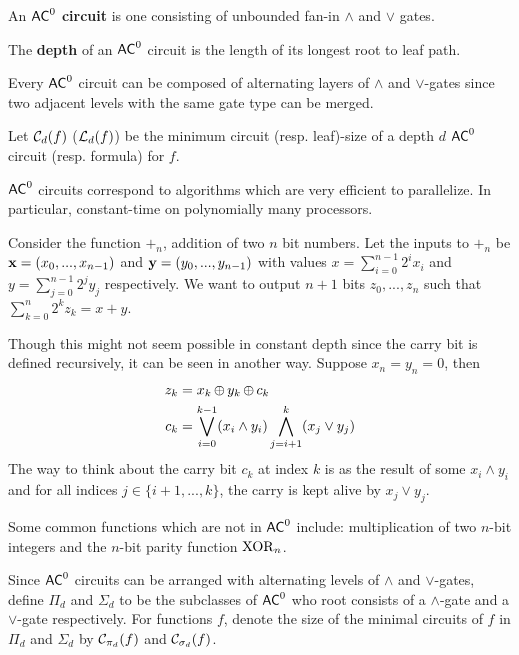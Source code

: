 \documentclass[11pt]{article}
\begin{document}
	\begin{definition}
		\label{def:classac0}
		An \textbf{$\mathsf{AC}^0$ circuit} is one consisting of unbounded fan-in $\land$ and $\lor$ gates. 
		
		The \textbf{depth} of an $\mathsf{AC}^0$ circuit is the length of its longest root to leaf path.
		
		Every $\mathsf{AC}^0$ circuit can be composed of alternating layers of $\land$ and $\lor$-gates since two adjacent levels with the same gate type can be merged.
		
		Let $\mathcal{C}_{d}(f)$ ($\mathcal{L}_{d}(f)$) be the minimum circuit (resp. leaf)-size of a depth $d$ $\mathsf{AC}^0$ circuit (resp. formula) for $f$. 
	\end{definition}
	$\mathsf{AC}^0$ circuits correspond to algorithms which are very efficient to parallelize. In particular, constant-time on polynomially many processors.
	
	\begin{example}
		Consider the function $+_{n}$, addition of two $n$ bit numbers. Let the inputs to $+_{n}$ be $\mathbf{x} = (x_0, ..., x_{n-1})$ and $\mathbf{y} = (y_0, ..., y_{n-1})$ with values $x = \sum_{i = 0}^{n-1}2^{i}x_i$ and $y = \sum_{j = 0}^{n-1}2^{j}y_j$ respectively. We want to output $n+1$ bits $z_0, ..., z_{n}$ such that $\sum_{k = 0}^{n} 2^{k}z_k = x + y$. 
		
		Though this might not seem possible in constant depth since the carry bit is defined recursively, it can be seen in another way. Suppose $x_{n} = y_{n} = 0$, then
		\begin{align*}
			z_k &= x_k \operatorname{\oplus} y_k \operatorname{\oplus} c_k\\
			c_k &= \bigvee_{i = 0}^{k-1} (x_i \land y_i) \bigwedge_{j = i+1}^{k}(x_j \lor y_j)
		\end{align*}
		The way to think about the carry bit $c_k$ at index $k$ is as the result of some $x_i \land y_i$ and for all indices $j \in \{i+1, ..., k\}$, the carry is kept alive by $x_j \lor y_j$.
	\end{example}
	Some common functions which are not in $\mathsf{AC}^0$ include: multiplication of two $n$-bit integers and the $n$-bit parity function $\mathrm{XOR}_n$.
	
	Since $\mathsf{AC}^0$ circuits can be arranged with alternating levels of $\land$ and $\lor$-gates, define $\Pi_d$ and $\Sigma_d$ to be the subclasses of $\mathsf{AC}^0$ who root consists of a $\land$-gate and a $\lor$-gate respectively. For functions $f$, denote the size of the  minimal circuits of $f$ in $\Pi_d$ and $\Sigma_d$ by $\mathcal{C}_{\pi_d}(f)$ and $\mathcal{C}_{\sigma_d}(f)$. 
	
\end{document}
